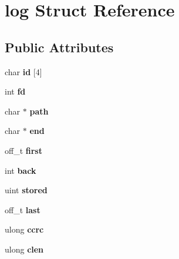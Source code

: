 \hypertarget{structlog}{\section{log Struct Reference}
\label{structlog}
}
\subsection*{Public Attributes}
\begin{DoxyCompactItemize}
\item 
\hypertarget{structlog_a6f0ee5f396b94e33be0dba9cdef48b46}{char {\bfseries id} \mbox{[}4\mbox{]}}\label{structlog_a6f0ee5f396b94e33be0dba9cdef48b46}

\item 
\hypertarget{structlog_aac6e90068f890c8b97924668e0f6d48f}{int {\bfseries fd}}\label{structlog_aac6e90068f890c8b97924668e0f6d48f}

\item 
\hypertarget{structlog_a48c428db4e5ddb4941c3e16886ca6619}{char $\ast$ {\bfseries path}}\label{structlog_a48c428db4e5ddb4941c3e16886ca6619}

\item 
\hypertarget{structlog_ae21c7c8b7e8ddba66b7f4d0a0e2efd5a}{char $\ast$ {\bfseries end}}\label{structlog_ae21c7c8b7e8ddba66b7f4d0a0e2efd5a}

\item 
\hypertarget{structlog_a8a8da4d613191483ee0d9c145bc2c9aa}{off\+\_\+t {\bfseries first}}\label{structlog_a8a8da4d613191483ee0d9c145bc2c9aa}

\item 
\hypertarget{structlog_a31363cd250394e9b0a66b8b8be230024}{int {\bfseries back}}\label{structlog_a31363cd250394e9b0a66b8b8be230024}

\item 
\hypertarget{structlog_a213ed17ff665cbbcc29d811c1b870cec}{uint {\bfseries stored}}\label{structlog_a213ed17ff665cbbcc29d811c1b870cec}

\item 
\hypertarget{structlog_a8fa8a4611c57d15e286080602b38fa7a}{off\+\_\+t {\bfseries last}}\label{structlog_a8fa8a4611c57d15e286080602b38fa7a}

\item 
\hypertarget{structlog_a59b7aeffac2c4fc8ca125be47ed272a7}{ulong {\bfseries ccrc}}\label{structlog_a59b7aeffac2c4fc8ca125be47ed272a7}

\item 
\hypertarget{structlog_acad050aa5fd8c766cc84f161ebdb6806}{ulong {\bfseries clen}}\label{structlog_acad050aa5fd8c766cc84f161ebdb6806}


\end{DoxyCompactItemize}
